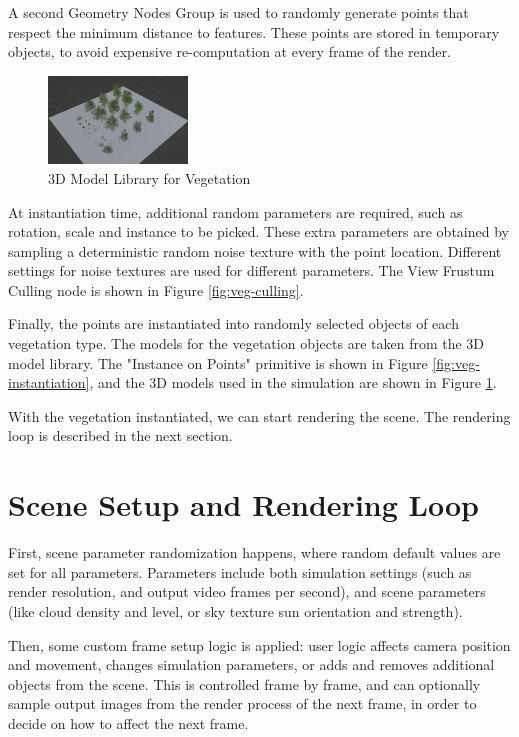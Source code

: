 A second Geometry Nodes Group is used to randomly generate points that respect the minimum distance to features. These points are stored in temporary objects, to avoid expensive re-computation at every frame of the render. 

\begin{figure}
    \centering
    \includegraphics[width=0.33\textwidth]{src/img/vegetation/tree-model-library.jpg}
     \caption{3D Model Library for Vegetation}
     \label{fig:veg-models}
\end{figure}

At instantiation time, additional random parameters are required, such as rotation, scale and instance to be picked. These extra parameters are obtained by sampling a deterministic random noise texture with the point location. Different settings for noise textures are used for different parameters. The View Frustum Culling node is shown in Figure \ref{fig:veg-culling}.

Finally, the points are instantiated into randomly selected objects of each vegetation type. The models for the vegetation objects are taken from the 3D model library. The "Instance on Points" primitive is shown in Figure \ref{fig:veg-instantiation}, and the 3D models used in the simulation are shown in Figure \ref{fig:veg-models}.

With the vegetation instantiated, we can start rendering the scene. The rendering loop is described in the next section.

\section{Scene Setup and Rendering Loop}
\label{sec:rendering}


First, scene parameter randomization happens, where random default values are set for all parameters. Parameters include both simulation settings (such as render resolution, and output video frames per second), and scene parameters (like cloud density and level, or sky texture sun orientation and strength).

Then, some custom frame setup logic is applied: user logic affects camera position and movement, changes simulation parameters, or adds and removes additional objects from the scene. This is controlled frame by frame, and can optionally sample output images from the render process of the next frame, in order to decide on how to affect the next frame.

